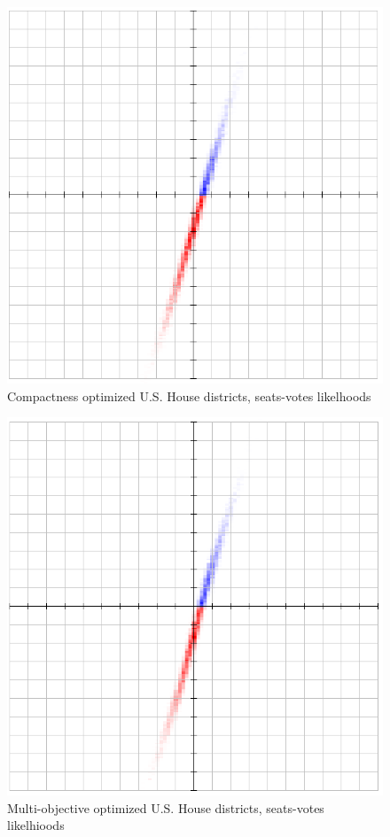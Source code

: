 \documentclass[preprint,12pt]{article}
\begin{document}
\begin{figure}[htb!]
    \begin{center}
        \includegraphics[scale=0.5]{Figures/original_method/BD__ush.png}
        \caption{Compactness optimized U.S. House districts, seats-votes likelhoods}\label{fig:BD_ush}
    \end{center}
\end{figure}
\begin{figure}[htb!]
    \begin{center}
        \includegraphics[scale=0.5]{Figures/original_method/SM__ush.png}
        \caption{Multi-objective optimized U.S. House districts, seats-votes likelhioods}\label{fig:SM_ush}
    \end{center}
\end{figure}
\end{document}
